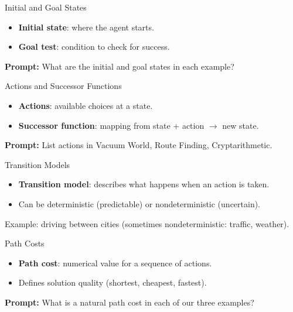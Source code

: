 \documentclass[aspectratio=169]{beamer}
\begin{document}
\begin{frame}{Initial and Goal States}
  \begin{itemize}
    \item \textbf{Initial state}: where the agent starts.
    \item \textbf{Goal test}: condition to check for success.
  \end{itemize}
  \vspace{0.3cm}
  \textbf{Prompt:} What are the initial and goal states in each example?
\end{frame}

\begin{frame}{Actions and Successor Functions}
  \begin{itemize}
    \item \textbf{Actions}: available choices at a state.
    \item \textbf{Successor function}: mapping from state + action $\to$ new state.
  \end{itemize}
  \vspace{0.3cm}
  \textbf{Prompt:} List actions in Vacuum World, Route Finding, Cryptarithmetic.
\end{frame}

\begin{frame}{Transition Models}
  \begin{itemize}
    \item \textbf{Transition model}: describes what happens when an action is taken.
    \item Can be deterministic (predictable) or nondeterministic (uncertain).
  \end{itemize}
  \vspace{0.3cm}
  Example: driving between cities (sometimes nondeterministic: traffic, weather).
\end{frame}

\begin{frame}{Path Costs}
  \begin{itemize}
    \item \textbf{Path cost}: numerical value for a sequence of actions.
    \item Defines solution quality (shortest, cheapest, fastest).
  \end{itemize}
  \vspace{0.3cm}
  \textbf{Prompt:} What is a natural path cost in each of our three examples?
\end{frame}
\end{document}
